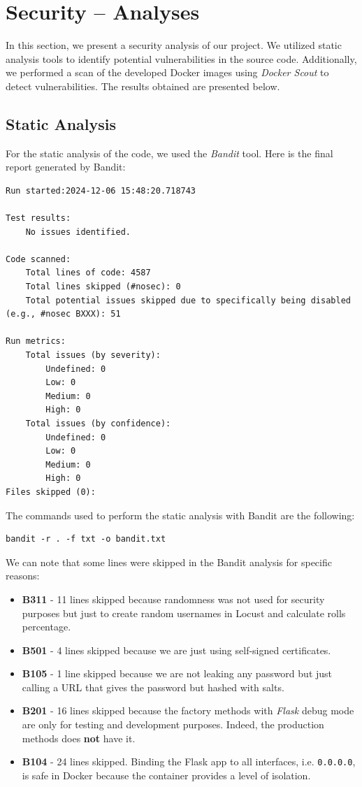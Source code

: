 \documentclass{article}
\begin{document}
\section{Security – Analyses}
In this section, we present a security analysis of our project. We utilized static analysis tools to identify potential vulnerabilities in the source code. Additionally, we performed a scan of the developed Docker images using \emph{Docker Scout} to detect vulnerabilities. The results obtained are presented below.

\subsection{Static Analysis}
For the static analysis of the code, we used the \emph{Bandit} tool. Here is the final report generated by Bandit:
\begin{verbatim}
Run started:2024-12-06 15:48:20.718743

Test results:
	No issues identified.

Code scanned:
	Total lines of code: 4587
	Total lines skipped (#nosec): 0
	Total potential issues skipped due to specifically being disabled (e.g., #nosec BXXX): 51

Run metrics:
	Total issues (by severity):
		Undefined: 0
		Low: 0
		Medium: 0
		High: 0
	Total issues (by confidence):
		Undefined: 0
		Low: 0
		Medium: 0
		High: 0
Files skipped (0):
\end{verbatim}

The commands used to perform the static analysis with Bandit are the following:
\begin{verbatim}
bandit -r . -f txt -o bandit.txt
\end{verbatim}

We can note that some lines were skipped in the Bandit analysis for specific reasons:

\begin{itemize}
    \item \textbf{B311} - 11 lines skipped because randomness was not used for security purposes but just to create random usernames in Locust and calculate rolls percentage.
    \item \textbf{B501} - 4 lines skipped because we are just using self-signed certificates.
    \item \textbf{B105} - 1 line skipped because we are not leaking any password but just calling a URL that gives the password but hashed with salts.
    \item \textbf{B201} - 16 lines skipped because the factory methods with \emph{Flask} debug mode are only for testing and development purposes. Indeed, the production methods does \textbf{not} have it.
    \item \textbf{B104} - 24 lines skipped. Binding the Flask app to all interfaces, i.e. \texttt{0.0.0.0}, is safe in Docker because the container provides a level of isolation.
\end{itemize}
\end{document}
